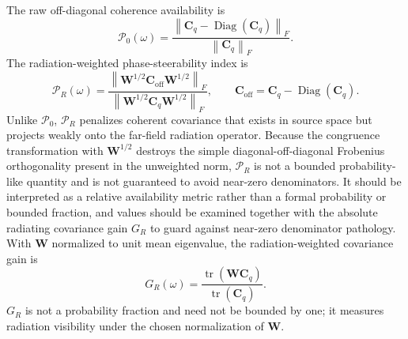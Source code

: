 \documentclass[11pt]{article}
\newcommand{\mat}[1]{\bm{#1}}
\begin{document}
The raw off-diagonal coherence availability is
\begin{equation}
    \mathcal P_0(\omega)
    =
    \frac{
    \left\|
        \mat{C}_q-\operatorname{Diag}(\mat{C}_q)
    \right\|_F
    }{
    \left\|
        \mat{C}_q
    \right\|_F
    }.
\label{eq:p0}
\end{equation}
The radiation-weighted phase-steerability index is
\begin{equation}
    \mathcal P_R(\omega)
    =
    \frac{
    \left\|
        \mat{W}^{1/2}\mat{C}_{\mathrm{off}}\mat{W}^{1/2}
    \right\|_F
    }{
    \left\|
        \mat{W}^{1/2}\mat{C}_{q}\mat{W}^{1/2}
    \right\|_F
    },
    \qquad
    \mat{C}_{\mathrm{off}}
    =
    \mat{C}_q-\operatorname{Diag}(\mat{C}_q).
\label{eq:pr}
\end{equation}
Unlike $\mathcal P_0$, $\mathcal P_R$ penalizes coherent covariance that exists in source space but projects weakly onto the far-field radiation operator. Because the congruence transformation with $\mat{W}^{1/2}$ destroys the simple diagonal-off-diagonal Frobenius orthogonality present in the unweighted norm, $\mathcal P_R$ is not a bounded probability-like quantity and is not guaranteed to avoid near-zero denominators. It should be interpreted as a relative availability metric rather than a formal probability or bounded fraction, and values should be examined together with the absolute radiating covariance gain $G_R$ to guard against near-zero denominator pathology. With $\mat{W}$ normalized to unit mean eigenvalue, the radiation-weighted covariance gain is
\begin{equation}
    G_R(\omega)
    =
    \frac{
        \operatorname{tr}(\mat{W}\mat{C}_q)
    }{
        \operatorname{tr}(\mat{C}_q)
    }.
\label{eq:radiating_gain}
\end{equation}
$G_R$ is not a probability fraction and need not be bounded by one; it measures radiation visibility under the chosen normalization of $\mat{W}$.
\end{document}
